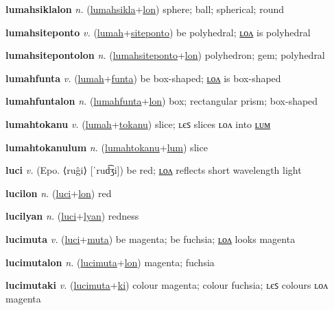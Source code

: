\textbf{\hypertarget{lumahsiklalon}{lumahsiklalon}} \textit{n.} (\hyperlink{lumahsikla}{lumahsikla}+\allowbreak \hyperlink{lon}{lon})
sphere; ball; spherical; round

\textbf{\hypertarget{lumahsiteponto}{lumahsiteponto}} \textit{v.} (\hyperlink{lumah}{lumah}+\allowbreak \hyperlink{siteponto}{siteponto})
be polyhedral; \hyperlink{lumahsitepontolon}{ʟᴏᴧ} is polyhedral

\textbf{\hypertarget{lumahsitepontolon}{lumahsitepontolon}} \textit{n.} (\hyperlink{lumahsiteponto}{lumahsiteponto}+\allowbreak \hyperlink{lon}{lon})
polyhedron; gem; polyhedral

\textbf{\hypertarget{lumahfunta}{lumahfunta}} \textit{v.} (\hyperlink{lumah}{lumah}+\allowbreak \hyperlink{funta}{funta})
be box-shaped; \hyperlink{lumahfuntalon}{ʟᴏᴧ} is box-shaped

\textbf{\hypertarget{lumahfuntalon}{lumahfuntalon}} \textit{n.} (\hyperlink{lumahfunta}{lumahfunta}+\allowbreak \hyperlink{lon}{lon})
box; rectangular prism; box-shaped

\textbf{\hypertarget{lumahtokanu}{lumahtokanu}} \textit{v.} (\hyperlink{lumah}{lumah}+\allowbreak \hyperlink{tokanu}{tokanu})
slice; ʟєꜱ slices ʟᴏᴧ into \hyperlink{lumahtokanulum}{ʟᴜᴍ}

\textbf{\hypertarget{lumahtokanulum}{lumahtokanulum}} \textit{n.} (\hyperlink{lumahtokanu}{lumahtokanu}+\allowbreak \hyperlink{lum}{lum})
slice

\textbf{\hypertarget{luci}{luci}} \textit{v.} (Epo. ⟨ruĝi⟩ [ˈrud͡ʒi])
be red; \hyperlink{lucilon}{ʟᴏᴧ} reflects short wavelength light

\textbf{\hypertarget{lucilon}{lucilon}} \textit{n.} (\hyperlink{luci}{luci}+\allowbreak \hyperlink{lon}{lon})
red

\textbf{\hypertarget{lucilyan}{lucilyan}} \textit{n.} (\hyperlink{luci}{luci}+\allowbreak \hyperlink{lyan}{lyan})
redness

\textbf{\hypertarget{lucimuta}{lucimuta}} \textit{v.} (\hyperlink{luci}{luci}+\allowbreak \hyperlink{muta}{muta})
be magenta; be fuchsia; \hyperlink{lucimutalon}{ʟᴏᴧ} looks magenta

\textbf{\hypertarget{lucimutalon}{lucimutalon}} \textit{n.} (\hyperlink{lucimuta}{lucimuta}+\allowbreak \hyperlink{lon}{lon})
magenta; fuchsia

\textbf{\hypertarget{lucimutaki}{lucimutaki}} \textit{v.} (\hyperlink{lucimuta}{lucimuta}+\allowbreak \hyperlink{ki}{ki})
colour magenta; colour fuchsia; ʟєꜱ colours ʟᴏᴧ magenta

